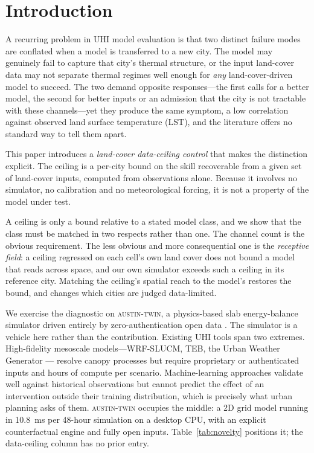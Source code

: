\documentclass[remotesensing,article,submit,oneauthor]{Definitions/mdpi}
\begin{document}
\section{Introduction}

A recurring problem in UHI model evaluation is that two distinct failure
modes are conflated when a model is transferred to a new city. The model
may genuinely fail to capture that city's thermal structure, or the input
land-cover data may not separate thermal regimes well enough for
\emph{any} land-cover-driven model to succeed. The two demand opposite
responses---the first calls for a better model, the second for better
inputs or an admission that the city is not tractable with these
channels---yet they produce the same symptom, a low correlation against
observed land surface temperature (LST), and the literature offers no
standard way to tell them apart.

This paper introduces a \emph{land-cover data-ceiling control} that makes
the distinction explicit. The ceiling is a per-city bound on the skill
recoverable from a given set of land-cover inputs, computed from
observations alone. Because it involves no simulator, no calibration and
no meteorological forcing, it is not a property of the model under test.

A ceiling is only a bound relative to a stated model class, and we show
that the class must be matched in two respects rather than one. The
channel count is the obvious requirement. The less obvious and more
consequential one is the \emph{receptive field}: a ceiling regressed on
each cell's own land cover does not bound a model that reads across
space, and our own simulator exceeds such a ceiling in its reference
city. Matching the ceiling's spatial reach to the model's restores the
bound, and changes which cities are judged data-limited.

We exercise the diagnostic on \textsc{austin-twin}, a physics-based slab
energy-balance simulator driven entirely by zero-authentication open data
\cite{oke1982energetic,voogt2003thermal,masson2000physically}. The
simulator is a vehicle here rather than the contribution. Existing UHI
tools span two extremes. High-fidelity mesoscale models---WRF-SLUCM, TEB,
the Urban Weather Generator \cite{bueno2013urban,kusaka2001simple}---
resolve canopy processes but require proprietary or authenticated inputs
and hours of compute per scenario. Machine-learning approaches
\cite{lyu2022integrated,hoang2025geospatial,bhamjee2024detection}
validate well against historical observations but cannot predict the
effect of an intervention outside their training distribution, which is
precisely what urban planning asks of them. \textsc{austin-twin} occupies
the middle: a 2D grid model running in 10.8~ms per 48-hour simulation on
a desktop CPU, with an explicit counterfactual engine and fully open
inputs. Table~\ref{tab:novelty} positions it; the data-ceiling column has
no prior entry.
\end{document}
